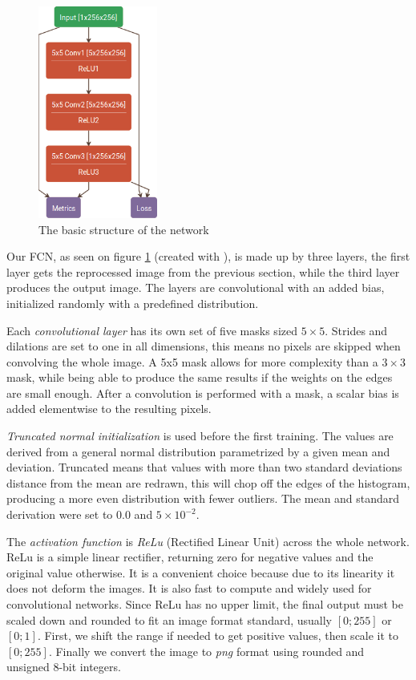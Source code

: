 \documentclass[12pt]{report}
\begin{document}
\begin{figure}
	\includegraphics[width=0.35\textwidth]{images/net.png}
	\caption{The basic structure of the network}
	\label{net}
\end{figure}
Our FCN, as seen on figure \ref{net} (created with \cite{netscope}), is made up by three layers, the first layer gets the reprocessed image from the previous section, while the third layer produces the output image. The layers are convolutional with an added bias, initialized randomly with a predefined distribution.

Each \textit{convolutional layer} has its own set of five masks sized $5\times5$. Strides and dilations are set to one in all dimensions, this means no pixels are skipped when convolving the whole image. A 5x5 mask allows for more complexity than a $3\times3$ mask, while being able to produce the same results if the weights on the edges are small enough. After a convolution is performed with a mask, a scalar bias is added elementwise to the resulting pixels.

\textit{Truncated normal initialization} \cite{trunc} is used before the first training. The values are derived from a general normal distribution parametrized by a given mean and deviation. Truncated means that values with more than two standard deviations distance from the mean are redrawn, this will chop off the edges of the histogram, producing a more even distribution with fewer outliers. The mean and standard derivation were set to $0.0$ and $ 5\times10^{-2} $.

The \textit{activation function} is \textit{ReLu} (Rectified Linear Unit) \cite{relu} across the whole network. ReLu is a simple linear rectifier, returning zero for negative values and the original value otherwise. It is a convenient choice because due to its linearity it does not deform the images. It is also fast to compute and widely used for convolutional networks. Since ReLu has no upper limit, the final output must be scaled down and rounded to fit an image format standard, usually $ \left[0;255\right] $ or $ \left[0;1\right] $. First, we shift the range if needed to get positive values, then scale it to $ \left[0;255\right] $. Finally we convert the image to \textit{png} format using rounded and unsigned 8-bit integers.
\end{document}
